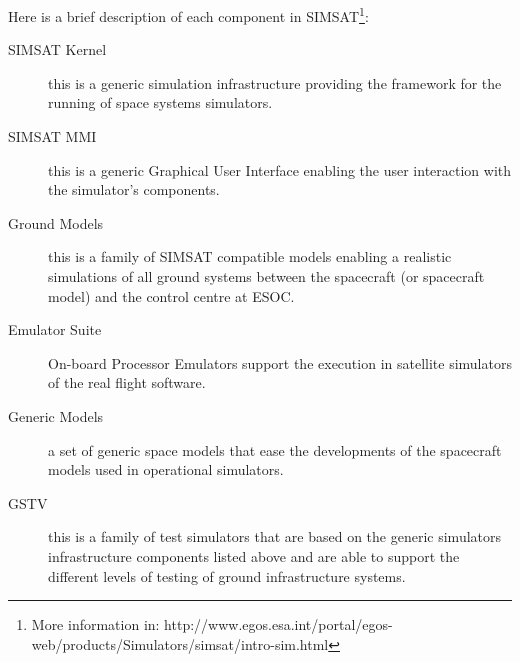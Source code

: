 Here is a brief description of each component in \ac{SIMSAT}\footnote{More information in: http://www.egos.esa.int/portal/egos-web/products/Simulators/simsat/intro-sim.html}:
\begin{description}
\item[\ac{SIMSAT} Kernel] this is a generic simulation infrastructure providing the framework for the running of space systems simulators.
\item[\ac{SIMSAT} \ac{MMI}] this is a generic Graphical User Interface enabling the user interaction with the simulator's components.
\item[Ground Models] this is a family of \ac{SIMSAT} compatible models enabling a realistic simulations of all ground systems between the spacecraft (or spacecraft model) and the control centre at \ac{ESOC}.
\item[Emulator Suite] On-board Processor Emulators support the execution in satellite simulators of the real flight software.
\item[Generic Models] a set of generic space models that ease the developments of the spacecraft models used in operational simulators.
\item[\ac{GSTV}] this is a family of test simulators that are based on the generic simulators infrastructure components listed above and are able to support the different levels of testing of ground infrastructure systems.
\end{description}

